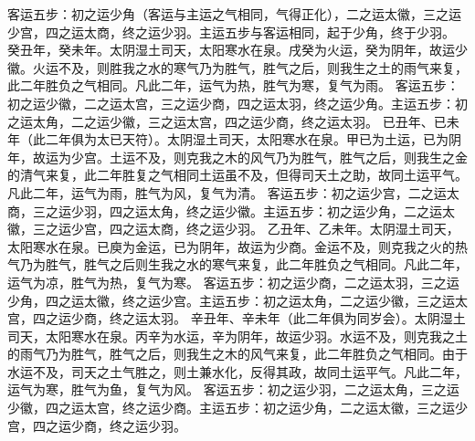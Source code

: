\documentclass[a4paper,12pt,UTF8,twoside]{ctexbook}
\begin{document}
客运五步：初之运少角（客运与主运之气相同，气得正化），二之运太徽，三之运少宫，四之运太商，终之运少羽。主运五步与客运相同，起于少角，终于少羽。
癸丑年，癸未年。太阴湿土司天，太阳寒水在泉。戌癸为火运，癸为阴年，故运少徽。火运不及，则胜我之水的寒气乃为胜气，胜气之后，则我生之土的雨气来复，此二年胜负之气相同。凡此二年，运气为热，胜气为寒，复气为雨。
客运五步：初之运少徽，二之运太宫，三之运少商，四之运太羽，终之运少角。主运五步：初之运太角，二之运少徽，三之运太宫，四之运少商，终之运太羽。
已丑年、已未年（此二年俱为太已天符）。太阴湿土司天，太阳寒水在泉。甲已为土运，已为阴年，故运为少宫。土运不及，则克我之木的风气乃为胜气，胜气之后，则我生之金的清气来复，此二年胜复之气相同土运虽不及，但得司天土之助，故同土运平气。凡此二年，运气为雨，胜气为风，复气为清。
客运五步：初之运少宫，二之运太商，三之运少羽，四之运太角，终之运少徽。主运五步：初之运少角，二之运太徽，三之运少宫，四之运太商，终之运少羽。
乙丑年、乙未年。太阴湿土司天，太阳寒水在泉。已庾为金运，已为阴年，故运为少商。金运不及，则克我之火的热气乃为胜气，胜气之后则生我之水的寒气来复，此二年胜负之气相同。凡此二年，运气为凉，胜气为热，复气为寒。
客运五步：初之运少商，二之运太羽，三之运少角，四之运太徽，终之运少宫。主运五步：初之运太角，二之运少徽，三之运太宫，四之运少商，终之运太羽。
辛丑年、辛未年（此二年俱为同岁会）。太阴湿土司天，太阳寒水在泉。丙辛为水运，辛为阴年，故运少羽。水运不及，则克我之土的雨气乃为胜气，胜气之后，则我生之木的风气来复，此二年胜负之气相同。由于水运不及，司天之土气胜之，则土兼水化，反得其政，故同土运平气。凡此二年，运气为寒，胜气为鱼，复气为风。
客运五步：初之运少羽，二之运太角，三之运少徽，四之运太宫，终之运少商。主运五步：初之运少角，二之运太徽，三之运少宫，四之运少商，终之运少羽。
\end{document}

